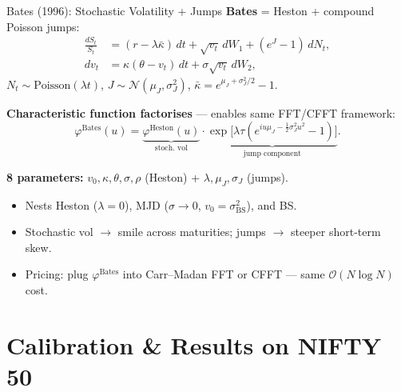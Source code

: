 \documentclass[10pt, aspectratio=169]{beamer}
\begin{document}
\begin{frame}{Bates (1996): Stochastic Volatility + Jumps}
\textbf{Bates} = Heston + compound Poisson jumps:
\begin{align}
  \frac{dS_t}{S_t} &= (r - \lambda\bar\kappa)\,dt + \sqrt{v_t}\,dW_1 + (e^J - 1)\,dN_t, \label{eq:bates_S} \\
  dv_t &= \kappa(\theta - v_t)\,dt + \sigma\sqrt{v_t}\,dW_2, \label{eq:bates_v}
\end{align}
$N_t \sim \text{Poisson}(\lambda t)$, $J \sim \mathcal{N}(\mu_J, \sigma_J^2)$, $\bar\kappa = e^{\mu_J + \sigma_J^2/2} - 1$.

\vspace{4pt}
\textbf{Characteristic function factorises} --- enables same FFT/CFFT framework:
\begin{equation}\label{eq:bates_cf}
  \varphi^{\text{Bates}}(u) = \underbrace{\varphi^{\text{Heston}}(u)}_{\text{stoch.\ vol}} \cdot \underbrace{\exp\!\bigl[\lambda\tau(e^{iu\mu_J - \frac{1}{2}\sigma_J^2 u^2} - 1)\bigr]}_{\text{jump component}}.
\end{equation}

\vspace{2pt}
\textbf{8 parameters:} $v_0, \kappa, \theta, \sigma, \rho$ (Heston) + $\lambda, \mu_J, \sigma_J$ (jumps).

\vspace{2pt}
\begin{itemize}\setlength\itemsep{1pt}
  \item Nests Heston ($\lambda=0$), MJD ($\sigma\to 0$, $v_0=\sigma_{\text{BS}}^2$), and BS.
  \item Stochastic vol $\to$ smile across maturities; jumps $\to$ steeper short-term skew.
  \item Pricing: plug $\varphi^{\text{Bates}}$ into Carr--Madan FFT or CFFT --- same $\mathcal{O}(N\log N)$ cost.
\end{itemize}
\end{frame}

\section{Calibration \& Results on NIFTY 50}
\end{document}
